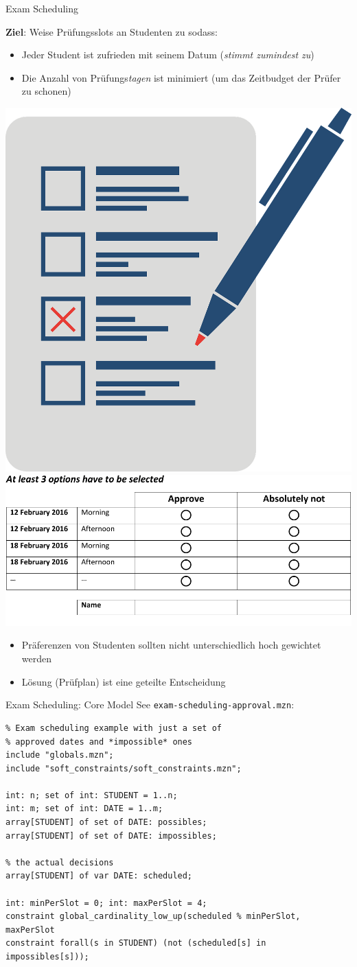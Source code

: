 

\begin{frame}[fragile]{Exam Scheduling}

\textbf{Ziel}: Weise Prüfungsslots an Studenten zu sodass:
\begin{itemize}
\item Jeder Student ist zufrieden mit seinem Datum (\emph{stimmt zumindest zu})
\item Die Anzahl von Prüfungs\emph{tagen} ist minimiert (um das Zeitbudget der Prüfer zu schonen)
\end{itemize}

\begin{center}
\includegraphics[width=.15\textwidth]{img/voting.png}
\hspace*{4ex}
\includegraphics[width=.5\textwidth]{img/Voting.pdf}
\end{center}

\begin{itemize}
\item Präferenzen von Studenten sollten nicht unterschiedlich hoch gewichtet werden
\item Lösung (Prüfplan) ist eine geteilte Entscheidung

\end{itemize}
\end{frame}

\begin{frame}[fragile]{Exam Scheduling: Core Model}
See \texttt{exam-scheduling-approval.mzn}:
\begin{lstlisting}
% Exam scheduling example with just a set of 
% approved dates and *impossible* ones
include "globals.mzn";
include "soft_constraints/soft_constraints.mzn";

int: n; set of int: STUDENT = 1..n; 
int: m; set of int: DATE = 1..m;
array[STUDENT] of set of DATE: possibles;
array[STUDENT] of set of DATE: impossibles;

% the actual decisions
array[STUDENT] of var DATE: scheduled;

int: minPerSlot = 0; int: maxPerSlot = 4;
constraint global_cardinality_low_up(scheduled % minPerSlot, maxPerSlot
constraint forall(s in STUDENT) (not (scheduled[s] in impossibles[s])); 
 
\end{lstlisting}
\end{frame}

